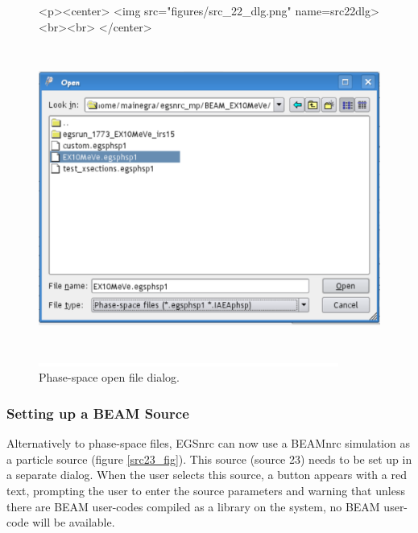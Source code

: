 \documentclass[12pt,twoside]{article}   %
\begin{document}
\begin{figure}[htb]
\begin{htmlonly}
\begin{rawhtml}
<p><center>
<img src="figures/src_22_dlg.png" name=src22dlg><br><br>
</center>
\end{rawhtml}
\end{htmlonly}
\begin{latexonly}
\begin{center}
\includegraphics[height=10cm]{figures/src_22_dlg}
\end{center}
\end{latexonly}
\begin{center}
\includegraphics[height=1mm]{figures/fake2}
\end{center}
\caption{Phase-space open file dialog.}
\label{src22_dlg}
\end{figure}

\subsubsection{Setting up a BEAM Source}

Alternatively to phase-space files, EGSnrc can now use a 
BEAMnrc simulation as a particle source (figure \ref{src23_fig}). 
This source
(source 23) needs to be set up in a separate dialog. When
the user selects this source, a button appears with a red
text, prompting the user to enter the source parameters and
warning that unless there are BEAM user-codes compiled as
a library on the system, no BEAM user-code will be available.
\vspace*{5mm}
\end{document}
